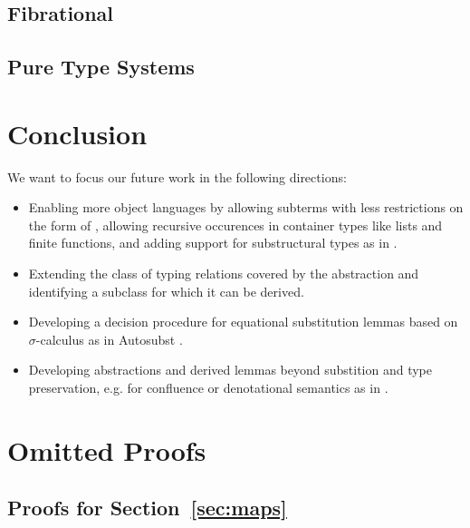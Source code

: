 \documentclass[a4paper, UKenglish, cleveref, autoref, thm-restate]{lipics-v2021}
\newenvironment{LibCode*}{%
  \begin{tcolorbox}[%
    colframe=white,%
    boxrule=0.0pt,%
    top=2.5pt,%
    left=2.5pt,%
    bottom=2.5pt,%
    right=2.5pt,%
    before skip=5pt,%
    after skip=5pt,%
    boxsep=0pt%
  ]
}{%
  \end{tcolorbox}%
}
\newcommand*\LibCode[1]{\begin{LibCode*}{#1}\end{LibCode*}}
\newcommand*\ACode[1]{\AgdaFontStyle{\textcolor{mygray}{#1}}}
\newcommand*\ACon[1]{\AgdaInductiveConstructor{#1}}
\begin{document}
  \subsection{Fibrational}
  \cite{DBLP:conf/rta/LicataSR17}

  \subsection{Pure Type Systems}
  \cite{DBLP:conf/esop/BarendregtH90, berarditowards, terlouw1989een}

  \section{Conclusion}
  \label{sec:conclusion}
  We want to focus our future work in the following directions:
  \begin{itemize}
  \item
    Enabling more object languages by allowing subterms with less
    restrictions on the form of \ACode{S}, allowing recursive
    occurences in container types like lists and finite functions, and
    adding support for substructural types as in
    \cite{DBLP:journals/corr/abs-2005-02247}.
  \item
    Extending the class of typing relations covered by
    the \ACode{\ACon{TTraversal}} abstraction and identifying
    a subclass for which it can be derived.
  \item
    Developing a decision procedure for equational
    substitution lemmas based on $\sigma$-calculus as in Autosubst
    \cite{DBLP:conf/itp/SchaferTS15, DBLP:conf/cpp/StarkSK19}.
  \item
    Developing abstractions and derived lemmas beyond substition and
    type preservation, e.g. for confluence or denotational semantics
    as in \cite{DBLP:journals/pacmpl/AllaisA0MM18}.
  \end{itemize}

  

  \clearpage
  \appendix
  \onecolumn

  \section{Omitted Proofs}
  \label{sec:proofs}

  \subsection{Proofs for Section~\ref{sec:maps}}
  \LibCode\KIdLift
  \LibCode\KIdLiftProof
\end{document}
